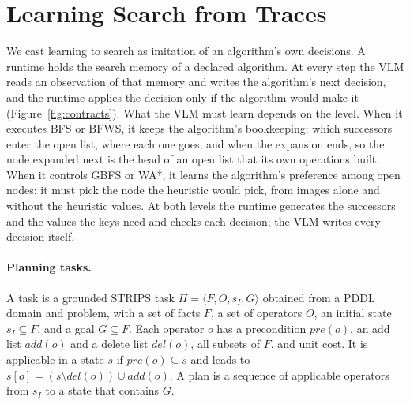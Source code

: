 \section{Learning Search from Traces}
\label{sec:policy}

We cast learning to search as imitation of an algorithm's own decisions. A runtime holds the search memory of a declared algorithm. At every step the VLM reads an observation of that memory and writes the algorithm's next decision, and the runtime applies the decision only if the algorithm would make it (Figure~\ref{fig:contracts}). What the VLM must learn depends on the level. When it executes BFS or BFWS, it keeps the algorithm's bookkeeping: which successors enter the open list, where each one goes, and when the expansion ends, so the node expanded next is the head of an open list that its own operations built. When it controls GBFS or WA*, it learns the algorithm's preference among open nodes: it must pick the node the heuristic would pick, from images alone and without the heuristic values. At both levels the runtime generates the successors and the values the keys need and checks each decision; the VLM writes every decision itself.

\paragraph{Planning tasks.} A task is a grounded STRIPS task $\Pi=\langle F,O,s_I,G\rangle$ obtained from a PDDL domain and problem, with a set of facts $F$, a set of operators $O$, an initial state $s_I\subseteq F$, and a goal $G\subseteq F$. Each operator $o$ has a precondition $\mathit{pre}(o)$, an add list $\mathit{add}(o)$ and a delete list $\mathit{del}(o)$, all subsets of $F$, and unit cost. It is applicable in a state $s$ if $\mathit{pre}(o)\subseteq s$ and leads to $s[o]=(s\setminus\mathit{del}(o))\cup\mathit{add}(o)$. A plan is a sequence of applicable operators from $s_I$ to a state that contains $G$.

